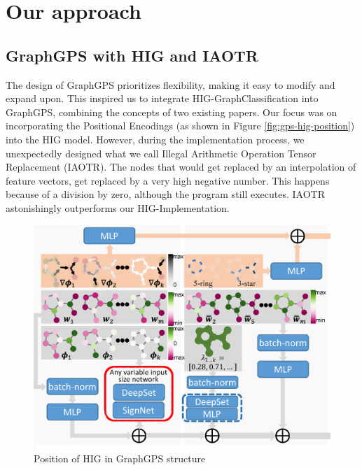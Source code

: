 \section{Our approach}
\subsection{GraphGPS with HIG and IAOTR}
\label{sec:graphgps_hig}
The design of GraphGPS prioritizes flexibility, making it easy to modify and expand upon. This inspired us to integrate HIG-GraphClassification into GraphGPS, combining the concepts of two existing papers. Our focus was on incorporating the Positional Encodings (as shown in Figure \autoref{fig:gps-hig-position}) into the HIG model. However, during the implementation process, we unexpectedly designed what we call Illegal Arithmetic Operation Tensor Replacement (IAOTR). The nodes that would get replaced by an interpolation of feature vectors, get replaced by a very high negative number. This happens because of a division by zero, although the program still executes. IAOTR astonishingly outperforms our HIG-Implementation.

\begin{figure}[!ht]
    \centering
    \includegraphics[scale=0.2]{tex/res/gps_hig_position.png}
    \caption{Position of HIG in GraphGPS structure}
    \label{fig:gps-hig-position}
\end{figure}

